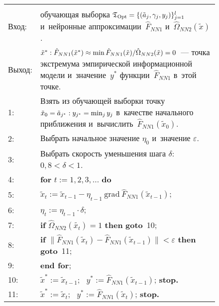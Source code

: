 \begin{multicols}{2}
\begin{figure*}
{\small 
\begin{center}
\begin{tabular}{lp{130mm}}
\hline
&\\[-9pt]
Вход: & обучающая выборка $\mathfrak{T}_{\mathrm{Opt}}
\hm=\{ (\tilde{a}_j,\gamma_j,y_j)\}_{j=1}^l$ и~нейронные 
аппроксимации~$\hat{F}_{NN1}$
и~$\hat{\Omega}_{NN2}(\tilde{x})$.\\
Выход: &
$\tilde{x}^{*}: \hat{F}_{NN1}(\tilde{x}^{*})\approx 
\min \hat{F}_{NN1}(\tilde{x}) /\hat{\Omega}_{NN2}(\tilde{x})\hm = 0$~--- 
точка экстремума эмпирической
информационной модели и~значение~$y^{*}$ функции~$\hat{F}_{NN1}$ в~этой точке.\\
\hline
\hphantom{9}1: &Взять из обучающей выборки точку $\tilde{x}_0\hm=\tilde{a}_{j^{*}}: 
y_{j^{*}}= \min_j y_j$  в~качестве
начального приближения и~вычислить~$\hat{F}_{NN1}(\tilde{x}_{0}) $.
\\
\hphantom{9}2: &Выбрать начальное значение $\eta_0$ и~значение $\varepsilon$.
\\
\hphantom{9}3: &Выбрать скорость уменьшения шага $\delta$: $0{,}8 < \delta <1$.
\\
\hphantom{9}4: &\textbf{for} $t:= 1,2, 3,\dots $ \textbf{do}
\\
\hphantom{9}5: &\hspace*{5mm}$ \tilde{x}_t:=\tilde{x}_{t-1} -\eta_{t-1} \ 
\mathrm{grad} \ \hat{F}_{NN1}(\tilde{x}_{t-1}) $;\\
\hphantom{9}6: &\hspace*{5mm}$\eta_t:=\eta_{t-1}\cdot \delta$;\\
\hphantom{9}7: &\hspace{5mm}\textbf{if} $\hat{\Omega}_{NN2}(\tilde{x_t})=1$ 
\textbf{then} \textbf{goto}~10;\\
\hphantom{9}8: &\hspace{5mm}\textbf{if} $\|\hat{F}_{NN1}(\tilde{x}_{t})
  - \hat{F}_{NN1}(\tilde{x}_{t-1})  \| < \varepsilon $ \textbf{then  goto}~11;\\
\hphantom{9}9: &\textbf{end for};\\
10: &$\tilde{x}^{*}:= \tilde{x}_{t-1}$; \ $y^{*}:=\hat{F}_{NN1}(\tilde{x}_{t-1})$; 
\textbf{stop.}\\
11: &$\tilde{x}^{*}:= \tilde{x}_t$; \ $y^{*}:=\hat{F}_{NN1}(\tilde{x}_t)$; 
\textbf{stop.}\\
\hline
\end{tabular}
\end{center}
}
\end{figure*}


\end{multicols}
